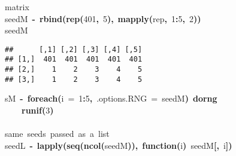 \documentclass[a4paper,12pt]{article}\usepackage{graphicx, color}
\makeatletter
\newcommand{\hlnumber}[1]{\textcolor[rgb]{0,0,0}{#1}}%
\newcommand{\hlfunctioncall}[1]{\textcolor[rgb]{0.501960784313725,0,0.329411764705882}{\textbf{#1}}}%
\newcommand{\hlkeyword}[1]{\textcolor[rgb]{0,0,0}{\textbf{#1}}}%
\newcommand{\hlargument}[1]{\textcolor[rgb]{0.690196078431373,0.250980392156863,0.0196078431372549}{#1}}%
\newcommand{\hlcomment}[1]{\textcolor[rgb]{0.180392156862745,0.6,0.341176470588235}{#1}}%
\newcommand{\hlformalargs}[1]{\textcolor[rgb]{0.690196078431373,0.250980392156863,0.0196078431372549}{#1}}%
\newcommand{\hlassignement}[1]{\textcolor[rgb]{0,0,0}{\textbf{#1}}}%
\newcommand{\hlsymbol}[1]{\textcolor[rgb]{0,0,0}{#1}}%
\newcommand{\hlstd}[1]{\textcolor[rgb]{0,0,0}{#1}}%
\newenvironment{kframe}{%
 \def\FrameCommand##1{\hskip\@totalleftmargin \hskip-\fboxsep
 \colorbox{shadecolor}{##1}\hskip-\fboxsep
     \hskip-\linewidth \hskip-\@totalleftmargin \hskip\columnwidth}%
 \MakeFramed {\advance\hsize-\width
   \@totalleftmargin\z@ \linewidth\hsize
   \@setminipage}}%
 {\par\unskip\endMakeFramed}
\newenvironment{knitrout}{}{} %
\renewenvironment{knitrout}{\begin{footnotesize}}{\end{footnotesize}}
\makeatother
\begin{document}
\begin{description}
\begin{knitrout}
\begin{kframe}
\begin{flushleft}
\hlstd{}\hlcomment{\usebox{\hlnormalsizeboxhash}\usebox{\hlnormalsizeboxhash}{\ }matrix}\hspace*{\fill}\\
\hlstd{}\hlsymbol{seedM}{\ }\hlassignement{\usebox{\hlnormalsizeboxlessthan}-}{\ }\hlfunctioncall{rbind}\hlkeyword{(}\hlfunctioncall{rep}\hlkeyword{(}\hlnumber{401}\hlkeyword{,}{\ }\hlnumber{5}\hlkeyword{)}\hlkeyword{,}{\ }\hlfunctioncall{mapply}\hlkeyword{(}\hlsymbol{rep}\hlkeyword{,}{\ }\hlnumber{1}\hlkeyword{:}\hlnumber{5}\hlkeyword{,}{\ }\hlnumber{2}\hlkeyword{)}\hlkeyword{)}\hspace*{\fill}\\
\hlstd{}\hlsymbol{seedM}\mbox{}
\normalfont
\end{flushleft}
\begin{verbatim}
##      [,1] [,2] [,3] [,4] [,5]
## [1,]  401  401  401  401  401
## [2,]    1    2    3    4    5
## [3,]    1    2    3    4    5
\end{verbatim}
\begin{flushleft}
\ttfamily\noindent
\hlsymbol{sM}{\ }\hlassignement{\usebox{\hlnormalsizeboxlessthan}-}{\ }\hlfunctioncall{foreach}\hlkeyword{(}\hlargument{i}{\ }\hlargument{=}{\ }\hlnumber{1}\hlkeyword{:}\hlnumber{5}\hlkeyword{,}{\ }\hlargument{.options.RNG}{\ }\hlargument{=}{\ }\hlsymbol{seedM}\hlkeyword{)}{\ }\hlkeyword{\usebox{\hlnormalsizeboxpercent}dorng\usebox{\hlnormalsizeboxpercent}}{\ }\hlkeyword{\usebox{\hlnormalsizeboxopenbrace}}\hspace*{\fill}\\
\hlstd{}{\ }{\ }{\ }{\ }\hlfunctioncall{runif}\hlkeyword{(}\hlnumber{3}\hlkeyword{)}\hspace*{\fill}\\
\hlstd{}\hlkeyword{\usebox{\hlnormalsizeboxclosebrace}}\hspace*{\fill}\\
\hlstd{}\hlcomment{\usebox{\hlnormalsizeboxhash}{\ }same{\ }seeds{\ }passed{\ }as{\ }a{\ }list}\hspace*{\fill}\\
\hlstd{}\hlsymbol{seedL}{\ }\hlassignement{\usebox{\hlnormalsizeboxlessthan}-}{\ }\hlfunctioncall{lapply}\hlkeyword{(}\hlfunctioncall{seq}\hlkeyword{(}\hlfunctioncall{ncol}\hlkeyword{(}\hlsymbol{seedM}\hlkeyword{)}\hlkeyword{)}\hlkeyword{,}{\ }\hlkeyword{function}\hlkeyword{(}\hlformalargs{i}\hlkeyword{)}{\ }\hlsymbol{seedM}\hlkeyword{[}\hlkeyword{,}{\ }\hlsymbol{i}\hlkeyword{]}\hlkeyword{)}\hspace*{\fill}\\

\end{flushleft}
\end{kframe}
\end{knitrout}
\end{description}
\end{document}
